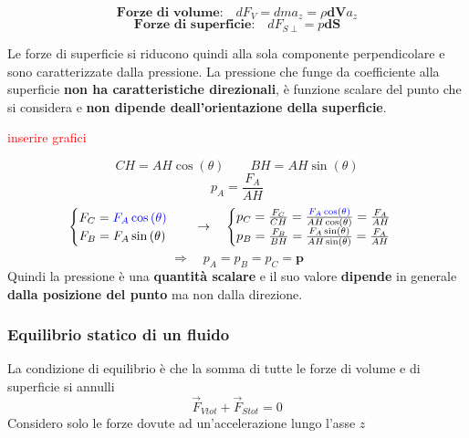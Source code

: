 \documentclass[x11names]{article}
\begin{document}
	\[ 
	\textbf{Forze di volume:} \quad dF_V = dma_z = \rho \boldsymbol{dV}a_z
	\]
	\[ 
	\textbf{Forze di superficie:} \quad dF_{S\perp} = p\boldsymbol{dS}
	\]
	
	\noindent
	Le forze di superficie si riducono quindi alla sola componente perpendicolare e sono caratterizzate dalla pressione. La pressione che funge da coefficiente alla superficie \textbf{non ha caratteristiche direzionali}, è funzione scalare del punto che si considera e \textbf{non dipende deall'orientazione della superficie}.
	
	\begin{center}
		\textcolor{red}{inserire grafici}
	\end{center}
	\[ 
	\boxed{CH = AH \cos\left(\theta\right)} \qquad \boxed{BH = AH \sin\left(\theta\right)}
	\]
	\[ 
	p_A = \frac{F_A}{AH}
	\]
	\[ 
	\begin{cases}
		F_C = \textcolor{blue}{F_A \cos\left(\theta\right)}\\
		F_B = F_A \sin\left(\theta\right)
	\end{cases} \quad \to \quad
	\begin{cases}
		p_C = \frac{F_C}{CH} = \frac{\textcolor{blue}{F_A \cos\left(\theta\right)}}{AH \cos\left(\theta\right)} = \frac{F_A}{AH} \\
		p_B = \frac{F_B}{BH} = \frac{F_A \sin\left(\theta\right)}{AH \sin\left(\theta\right)} = \frac{F_A}{AH}
	\end{cases}
	\]
	\[ 
	\Longrightarrow\quad p_A = p_B = p_C =\boldsymbol{p}
	\]
	Quindi la pressione è una \textbf{quantità scalare} e il suo valore \textbf{dipende} in generale \textbf{dalla posizione del punto} ma non dalla direzione.
	
	
		\subsubsection{Equilibrio statico di un fluido}
		La condizione di equilibrio è che la somma di tutte le forze di volume e di superficie si annulli
		\[ 
		\overrightarrow{F}_{Vtot} + \overrightarrow{F}_{Stot} = 0
		\]
		Considero solo le forze dovute ad un'accelerazione lungo l'asse \(z\)
		
\end{document}
